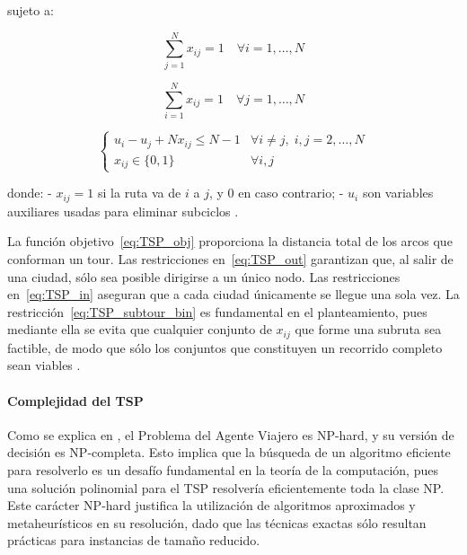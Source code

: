\documentclass[12pt,titlepage,twoside,openright]{book}
\begin{document}
sujeto a:

\begin{equation}
\sum_{j=1}^N x_{ij} = 1 \quad \forall i = 1,\dots,N
\label{eq:TSP_out}
\end{equation}

\begin{equation}
\sum_{i=1}^N x_{ij} = 1 \quad \forall j = 1,\dots,N
\label{eq:TSP_in}
\end{equation}

\begin{equation}
\begin{cases}
u_i - u_j + N x_{ij} \le N-1 & \forall i \neq j,\; i,j=2,\dots,N \\
x_{ij} \in \{0,1\} & \forall i,j
\end{cases}
\label{eq:TSP_subtour_bin}
\end{equation}

donde:
- \(x_{ij} = 1\) si la ruta va de \(i\) a \(j\), y 0 en caso contrario;
- \(u_i\) son variables auxiliares usadas para eliminar subciclos \citep{torres2018}.

La función objetivo~\eqref{eq:TSP_obj} proporciona la distancia total de los arcos que conforman un tour. Las restricciones en~\eqref{eq:TSP_out} garantizan que, al salir de una ciudad, sólo sea posible dirigirse a un único nodo. Las restricciones en~\eqref{eq:TSP_in} aseguran que a cada ciudad únicamente se llegue una sola vez. La restricción~\eqref{eq:TSP_subtour_bin} es fundamental en el planteamiento, pues mediante ella se evita que cualquier conjunto de \(x_{ij}\) que forme una subruta sea factible, de modo que sólo los conjuntos que constituyen un recorrido completo sean viables \citep{torres2018}.

\paragraph{Complejidad del TSP}

Como se explica en \cite{papadimitriou1998}, el Problema del Agente Viajero es NP-hard, y su versión de decisión es NP-completa. Esto implica que la búsqueda de un algoritmo eficiente para resolverlo es un desafío fundamental en la teoría de la computación, pues una solución polinomial para el TSP resolvería eficientemente toda la clase NP. Este carácter NP-hard justifica la utilización de algoritmos aproximados y metaheurísticos en su resolución, dado que las técnicas exactas sólo resultan prácticas para instancias de tamaño reducido.
\end{document}
